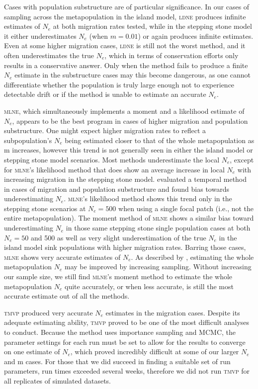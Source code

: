 Cases with population substructure are of particular significance. In our cases of sampling across 
the metapopulation in the island model, \textsc{ldne} produces infinite estimates of $N_e$ at 
both migration rates tested, while in the stepping stone model it either underestimates $N_e$ 
(when $m = 0.01$) or again produces infinite estimates. Even at some higher migration cases, \textsc{ldne} 
is still not the worst method, and it often underestimates the true $N_e$, which in terms of 
conservation efforts only results in a conservative answer. Only when the method fails to produce a 
finite $N_e$ estimate in the substructure cases may this become dangerous, as one cannot 
differentiate whether the population is truly large enough not to experience detectable drift or if 
the method is unable to estimate an accurate $N_e$.

\textsc{mlne}, which simultaneously implements a moment and a likelihood estimate of $N_e$, 
appears to be the best program in cases of higher migration and population substructure. One might 
expect higher migration rates to reflect a subpopulation's $N_e$ being estimated closer to 
that of the whole metapopulation as m increases, however this trend is not generally seen in either 
the island model or stepping stone model scenarios. Most methods underestimate the local $N_e$, 
except for \textsc{mlne}'s likelihood method that does show an average increase in local $N_e$ 
with increasing migration in the stepping stone model. \citet{Ryman:2013} evaluated a temporal method 
in cases of migration and population substructure and found bias towards underestimating $N_e$. 
\textsc{mlne}'s likelihood method shows this trend only in the stepping stone scenarios at $N_e = 500$ 
when using a single focal patch (i.e., not the entire metapopulation). The moment method of \textsc{mlne} shows 
a similar bias toward underestimating $N_e$ in those same stepping stone single population 
cases at both $N_e = 50$ and 500 as well as very slight underestimation of the true $N_e$ 
in the island model sink populations with higher migration rates. Barring those cases, \textsc{mlne} shows 
very accurate estimates of $N_e$. As described by \citet{Ryman:2013}, estimating the whole 
metapopulation $N_e$ may be improved by increasing sampling. Without increasing our sample size, 
we still find \textsc{mlne}'s moment method to estimate the whole metapopulation $N_e$ quite 
accurately, or when less accurate, is still the most accurate estimate out of all the methods.

\textsc{tmvp} produced very accurate $N_e$ estimates in the migration cases. Despite 
its adequate estimating ability, \textsc{tmvp} proved to be one of the most difficult analyses to conduct. 
Because the method uses importance sampling and MCMC, the parameter settings for each run must be set to 
allow for the results to converge on one estimate of $N_e$, which proved incredibly difficult at 
some of our larger $N_e$ and m cases. For those that we did succeed in finding a suitable set of 
run parameters, run times exceeded several weeks, therefore we did not run \textsc{tmvp} for all 
replicates of simulated datasets.

